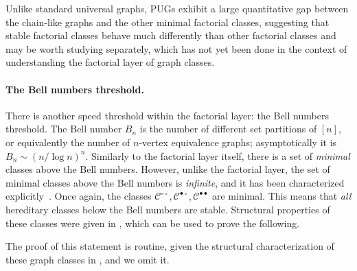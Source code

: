 \documentclass{theoretics}
\makeatletter
\newcommand{\cC}{\ensuremath{\mathcal{C}}}
\newcommand{\cF}{\ensuremath{\mathcal{F}}}
\newcommand*\chainyGraphs{chain-like graphs\xspace}
\newcommand{\dcirc}{{\circ\circ}}
\newcommand{\bcirc}{{\bullet\circ}}
\newcommand{\dbullet}{{\bullet\bullet}}
\newcommand\IfRestateTF{%
  \ifx\label\thmt@gobble@label %
    \expandafter\@firstoftwo
  \else
    \expandafter\@secondoftwo
  \fi
}
\newcommand{\RestateRemark}{\IfRestateTF{{\normalfont\bfseries (Restated) }}{}}
\makeatother
\begin{document}
Unlike standard universal graphs, PUGs exhibit a large quantitative gap between the \chainyGraphs
and the other minimal factorial classes, suggesting that stable factorial classes behave much differently than other factorial classes and may be worth studying separately, which has not yet been done in the context of understanding the factorial layer of graph classes.


\paragraph*{The Bell numbers threshold.}
There is another speed threshold within the factorial layer: the Bell numbers threshold.
The Bell number $B_n$ is the number of different set partitions of $[n]$, or equivalently the number
of $n$-vertex equivalence graphs; asymptotically it is $B_n \sim (n / \log n)^n$. Similarly to the
factorial layer itself, there is a set of \emph{minimal} classes above the Bell numbers.  However,
unlike the factorial layer, the set of minimal classes above the Bell numbers is \emph{infinite},
and it has been characterized explicitly~\cite{BBW05,ACFL16}. Once again, the classes $\cC^\dcirc,
\cC^\bcirc, \cC^\dbullet$ are minimal. This means that \emph{all} hereditary classes below the Bell
numbers are stable. Structural properties of these classes were given in \cite{BBW00}, which can be
used to prove the following.


The proof of this statement is routine, given the structural characterization of these graph classes
in \cite{BBW00,BBW05,ACFL16}, and we omit it.
\end{document}
